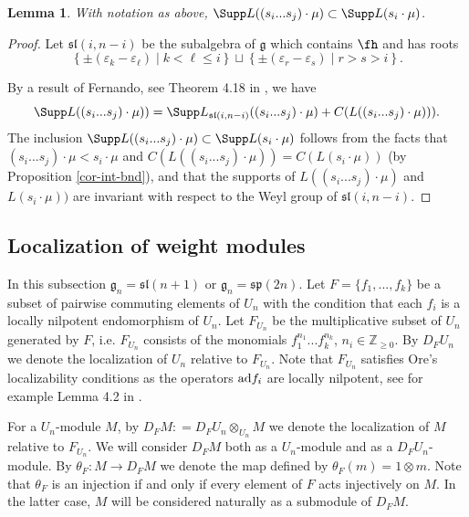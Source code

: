 \documentclass[12pt]{amsart}
\def\gg{\mathfrak{g}}
\def\gl{\mathfrak{l}}
\def\gs{\mathfrak{s}}
\newtheorem{lem}[thm]{Lemma}
\begin{document}
\begin{lem} \label{lem-step3} With notation as above, $\Supp L((s_i...s_j)\cdot \mu) \subset \Supp L(s_i\cdot \mu) $. 
\end{lem}
\begin{proof}
 Let $\gs \gl (i,n-i)$ be the subalgebra of $\gg$ which contains $\fh$ and has roots
$$\left\{\pm (\varepsilon_k - \varepsilon_{\ell}) \; | \; k < \ell  \leq i  \right\} \sqcup \left\{\pm (\varepsilon_r - \varepsilon_{s}) \; | \; r > s > i \right\}.$$

By a result of Fernando, see Theorem 4.18 in \cite{Fe}, we have
$$\Supp L((s_i...s_j)\cdot \mu)) = \Supp L_{\gs \gl (i,n-i)} ((s_i...s_j)\cdot \mu) + C(L((s_i...s_j)\cdot \mu))).$$
The inclusion $\Supp L((s_i...s_j)\cdot \mu) \subset \Supp L(s_i\cdot \mu) $ follows from the facts that  $(s_i...s_j)\cdot \mu < s_i\cdot \mu$ and $C(L((s_i...s_j )\cdot \mu)) = C(L(s_i \cdot \mu))$ (by Proposition \ref{cor-int-bnd}), and that the supports of $L((s_i...s_j)\cdot \mu)$ and $L(s_i\cdot \mu))$ are invariant with respect to the Weyl group of $\gs \gl (i,n-i)$. 
\end{proof}

\subsection{Localization of weight modules}
In this subsection $\gg_n = \mathfrak{sl}({n+1})$ or  $\gg_n = \mathfrak{sp}({2n})$.
Let  $F = \{ f_1,...,f_k\}$ be a  subset of pairwise commuting elements of $U_n$ with the condition that each $f_i$ is a locally nilpotent endomorphism of $U_n$.   Let 
$F_{U_n}$ be the multiplicative subset  of $U_n$ generated by $F$, i.e.  $F_{U_n}$  consists of the monomials $f_1^{n_1}...f_k^{n_k}$, $n_i \in {\mathbb Z}_{\geq 0}$. By $D_{F} U_n$ we denote the localization of $U_n$ relative to $F_{U_n}$. Note that $F_{U_n}$ satisfies Ore's localizability conditions  as the operators $\textup{ad} f_i$ are locally nilpotent, see for example Lemma 4.2 in \cite{M}. %


For a $U_n$-module $M$, by $D_F M: = D_F U_n \otimes_{U_n} M$ we denote the localization of $M$ relative to $F_{U_n}$. We will consider $D_F M$ both as a $U_n$-module and as a $D_F U_n$-module. 
By $\theta_{F} : M \to {D}_{F} M$ we denote the map defined by $\theta_{F} (m) = 1 \otimes m $. Note that $\theta_{F}$ is an injection if and only if every element of $F$ acts injectively on $M$. In the latter case, $M$ will be considered naturally as a submodule of ${D}_{F} M$.  
\end{document}
